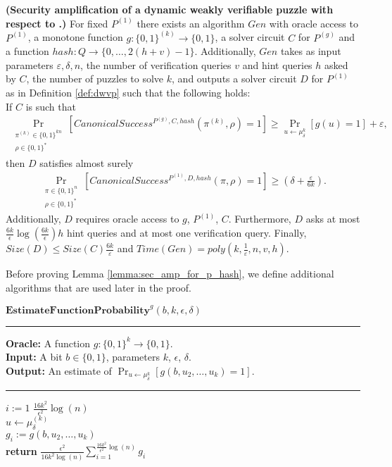 %
\begin{lemma}\textbf{(Security amplification of a dynamic weakly verifiable puzzle with respect to .)}
  \label{lemma:sec_amp_for_p_hash}
  For fixed $P^{(1)}$ there exists an algorithm $Gen$ with oracle access to
  $P^{(1)}$, a monotone function $g:\{0,1\}^{(k)} \rightarrow \{0,1\}$,
  a solver circuit $C$ for $P^{(g)}$ and a function $hash : Q \rightarrow \{0, \dots, 2(h+v)-1\}$.
  Additionally, $Gen$ takes as input parameters $\varepsilon, \delta, n$,
  the number of verification queries $v$ and hint queries $h$ asked by $C$, the number of puzzles to solve $k$,
  and outputs a solver circuit $D$ for $P^{(1)}$ as in Definition \ref{def:dwvp}
  such that the following holds: \\
  If $C$ is such that
  \begin{align*}
    \underset{\substack{\pi^{(k)} \in \{0,1\}^{kn} \\ \rho \in \{0,1\}^{*}}}{\Pr}\left[CanonicalSuccess^{P^{(g)}, C, hash}(\pi^{(k)}, \rho)=1\right]
    \geq \underset{u \leftarrow \mu_\delta^k}{\Pr}[g(u) = 1] + \varepsilon,
  \end{align*}
  then $D$ satisfies almost surely
  \begin{align*}
    \underset{\substack{\pi \in \{0,1\}^{n} \\ \rho \in \{0,1\}^{*}}}{\Pr}\left[CanonicalSuccess^{P^{(1)}, D, hash}(\pi, \rho)=1\right] \geq (\delta + \frac{\varepsilon}{6k}).
  \end{align*}
  Additionally, $D$ requires oracle access to $g$, $P^{(1)}$, $C$.
  Furthermore, $D$ asks at most $\frac{6k}{\epsilon}\log\left(\frac{6k}{\epsilon}\right) h$ hint queries and at most one verification query.
  Finally, $Size(D) \leq Size(C)\frac{6k}{\varepsilon}$ and $Time(Gen) = poly(k, \frac{1}{\varepsilon}, n, v, h)$.
\end{lemma}
%
%
Before proving Lemma \ref{lemma:sec_amp_for_p_hash}, we define additional algorithms that are used later in the proof.
%
\begin{codeblock}
  $\textbf{EstimateFunctionProbability}^{g}(b, k, \epsilon, \delta)$
  \medskip
  \hrule
  \medskip
  \textbf{Oracle:} A function $g : \{0,1\}^{k} \rightarrow \{0,1\}$.\\
  \textbf{Input:} A bit $b \in \{0,1\}$, parameters $k$, $\epsilon$, $\delta$. \\
  \textbf{Output:} An estimate of $\Pr_{u \leftarrow \mu_{\delta}^{k}}[g(b,u_2, \dots, u_k) = 1]$.
  \medskip\hrule\medskip
  \For $i:=1$ \To $\frac{16k^2}{\epsilon^2}\log(n)$ \Do \\
  \IndI $u \leftarrow \mu_{\delta}^{(k)}$ \\
  \IndI $g_i := g(b, u_2, \dots, u_k)$ \\
  \textbf{return} $\frac{\epsilon^2}{16k^2\log(n)} \sum_{i=1}^{\frac{16k^2}{\epsilon^2}\log(n)} g_i$
\end{codeblock}
